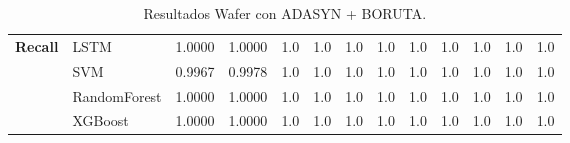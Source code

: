 \begin{table}[h]
\begin{adjustbox}{max width=11cm}
\begin{tabular}{|c|l|r|r|r|r|r|r|r|r|r|r|r|}
			\hline
			\textbf{Recall} & LSTM &  1.0000 &  1.0000 &  1.0 &  1.0 &  1.0 &  1.0 &  1.0 &  1.0 &  1.0 &  1.0 &  1.0 \\
			& SVM &  0.9967 &  0.9978 &  1.0 &  1.0 &  1.0 &  1.0 &  1.0 &  1.0 &  1.0 &  1.0 &  1.0 \\
			& RandomForest &  1.0000 &  1.0000 &  1.0 &  1.0 &  1.0 &  1.0 &  1.0 &  1.0 &  1.0 &  1.0 &  1.0 \\
			& XGBoost &  1.0000 &  1.0000 &  1.0 &  1.0 &  1.0 &  1.0 &  1.0 &  1.0 &  1.0 &  1.0 &  1.0 \\
			\hline
		\end{tabular}
	\end{adjustbox}
	\caption{Resultados Wafer con ADASYN + BORUTA.}
	\label{tab:Wafer_ADASYN_BORUTA}
\end{table}

